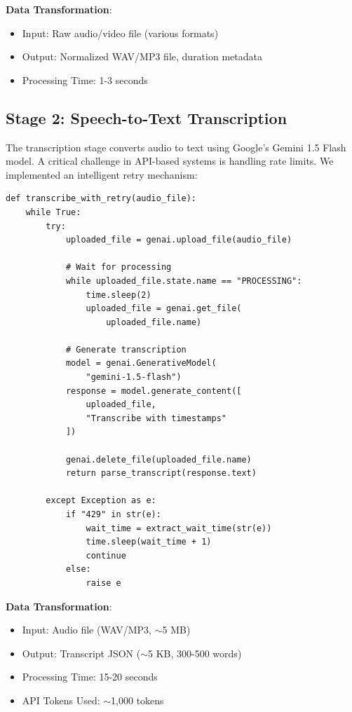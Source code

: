 \documentclass[conference]{IEEEtran}
\begin{document}
\textbf{Data Transformation}:
\begin{itemize}
    \item Input: Raw audio/video file (various formats)
    \item Output: Normalized WAV/MP3 file, duration metadata
    \item Processing Time: 1-3 seconds
\end{itemize}

\subsection{Stage 2: Speech-to-Text Transcription}

The transcription stage converts audio to text using Google's Gemini 1.5 Flash model. A critical challenge in API-based systems is handling rate limits. We implemented an intelligent retry mechanism:

\begin{lstlisting}[caption={Retry Mechanism with Rate Limiting}]
def transcribe_with_retry(audio_file):
    while True:
        try:
            uploaded_file = genai.upload_file(audio_file)
            
            # Wait for processing
            while uploaded_file.state.name == "PROCESSING":
                time.sleep(2)
                uploaded_file = genai.get_file(
                    uploaded_file.name)
            
            # Generate transcription
            model = genai.GenerativeModel(
                "gemini-1.5-flash")
            response = model.generate_content([
                uploaded_file,
                "Transcribe with timestamps"
            ])
            
            genai.delete_file(uploaded_file.name)
            return parse_transcript(response.text)
            
        except Exception as e:
            if "429" in str(e):
                wait_time = extract_wait_time(str(e))
                time.sleep(wait_time + 1)
                continue
            else:
                raise e
\end{lstlisting}

\textbf{Data Transformation}:
\begin{itemize}
    \item Input: Audio file (WAV/MP3, $\sim$5 MB)
    \item Output: Transcript JSON ($\sim$5 KB, 300-500 words)
    \item Processing Time: 15-20 seconds
    \item API Tokens Used: $\sim$1,000 tokens
\end{itemize}
\end{document}

